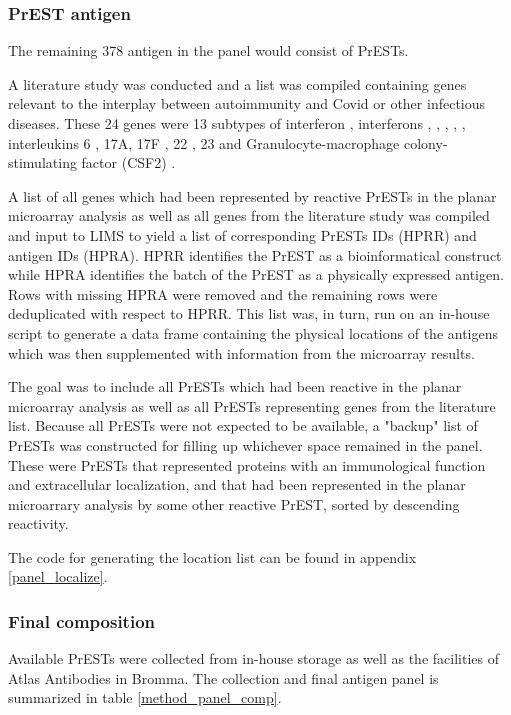 \documentclass{article}
\begin{document}
\subsubsection{PrEST antigen}
The remaining 378 antigen in the panel would consist of PrESTs.

A literature study was conducted and a list was compiled containing genes relevant to the interplay between autoimmunity and Covid or other infectious diseases. These 24 genes were 13 subtypes of interferon \textalpha{}, interferons \textomega, \textbeta, \textkappa, \textepsilon{} \cite{bastard}, \textgamma{} \cite{lit_ifng}, interleukins 6 \cite{lit_il6}, 17A, 17F , 22 \cite{lit_il17_22}, 23 and Granulocyte-macrophage colony-stimulating factor (CSF2) \cite{lit_il23_csf2}.

A list of all genes which had been represented by reactive PrESTs in the planar microarray analysis as well as all genes from the literature study was compiled and input to LIMS to yield a list of corresponding PrESTs IDs (HPRR) and antigen IDs (HPRA). HPRR identifies the PrEST as a bioinformatical construct while HPRA identifies the batch of the PrEST as a physically expressed antigen. Rows with missing HPRA were removed and the remaining rows were deduplicated with respect to HPRR. This list was, in turn, run on an in-house script to generate a data frame containing the physical locations of the antigens which was then supplemented with information from the microarray results.

The goal was to include all PrESTs which had been reactive in the planar microarray analysis as well as all PrESTs representing genes from the literature list. Because all PrESTs were not expected to be available, a "backup" list of PrESTs was constructed for filling up whichever space remained in the panel. These were PrESTs that represented proteins with an immunological function and extracellular localization, and that had been represented in the planar microarrary analysis by some other reactive PrEST, sorted by descending reactivity.

The code for generating the location list can be found in appendix \ref{panel_localize}.

\subsubsection{Final composition}
Available PrESTs were collected from in-house storage as well as the facilities of Atlas Antibodies in Bromma. The collection and final antigen panel is summarized in table \ref{method_panel_comp}.
\end{document}
